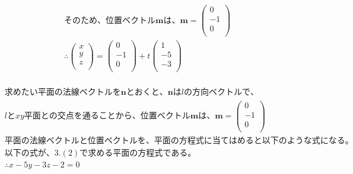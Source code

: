 \documentclass[dvipdfmx,uplatex]{jsarticle}
\begin{document}
\begin{equation}
\begin{aligned}
        &そのため、位置ベクトル\bm{m}は、 \bm{m} = \begin{pmatrix} 0\\ -1\\ 0\\ \end{pmatrix}\nonumber\\
        &\therefore \begin{pmatrix} x\\ y\\ z\\ \end{pmatrix} = \begin{pmatrix} 0\\ -1\\ 0\\ \end{pmatrix} + t\begin{pmatrix} 1\\ -5\\ -3\\ \end{pmatrix}\nonumber\\
    \end{aligned}
  \end{equation}

  \newpage
  \begin{equation}
    \begin{aligned}
        &求めたい平面の法線ベクトルを\bm{n}とおくと、\bm{n}はlの方向ベクトルで、\nonumber\\
        &lとxy平面との交点を通ることから、位置ベクトル\bm{m}は、\bm{m}= \begin{pmatrix} 0\\ -1\\ 0\\ \end{pmatrix} \nonumber\\
        &平面の法線ベクトルと位置ベクトルを、平面の方程式に当てはめると以下のような式になる。\nonumber\\
        &以下の式が、3.(2)で求める平面の方程式である。\nonumber\\
        &\therefore x-5y-3z-2=0 \nonumber\\
    \end{aligned}
  \end{equation}
\end{document}
